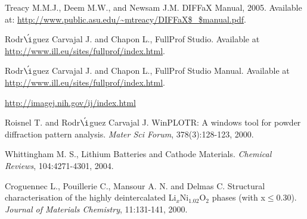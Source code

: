 \begin{thebibliography}{99}
 Treacy M.M.J., Deem M.W., and Newsam J.M. DIFFaX Manual, 2005. Available at: \url{http://www.public.asu.edu/~mtreacy/DIFFaX$\_$manual.pdf}. 

 Rodr$\acute{\i}$guez Carvajal J. and Chapon L., FullProf Studio. Available at \url{http://www.ill.eu/sites/fullprof/index.html}.

 Rodr$\acute{\i}$guez Carvajal J. and Chapon L., FullProf Studio Manual. Available at \url{http://www.ill.eu/sites/fullprof/index.html}.

 \url{http://imagej.nih.gov/ij/index.html}

 Roisnel T. and Rodr$\acute{\i}$guez Carvajal J. WinPLOTR: A windows tool for powder diffraction pattern analysis. \textit{Mater Sci Forum}, 378(3):128-123, 2000.

 Whittingham M. S., Lithium Batteries and Cathode Materials. \textit{Chemical Reviews}, 104:4271-4301, 2004. 

 Croguennec L., Pouillerie C., Mansour A. N. and Delmas C. Structural characterisation of the highly deintercalated Li$_{x}$Ni$_{1.02}$O$_{2}$ phases (with x$\leq$0.30). \textit{Journal of Materials Chemistry}, 11:131-141, 2000.



\end{thebibliography}
